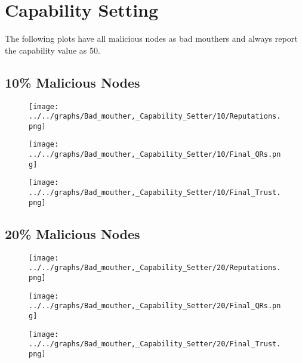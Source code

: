 \section*{Capability Setting}
The following plots have all malicious nodes as bad mouthers and always
report the capability value as 50.
\\
\begin{minipage}[t]{0.49\columnwidth}
\subsection*{10\% Malicious Nodes}
    \begin{figure}[H]
        \centering
        \texttt{[image: ../../graphs/Bad\_mouther,\_Capability\_Setter/10/Reputations.png]}
    \end{figure}
    \begin{figure}[H]
        \centering
        \texttt{[image: ../../graphs/Bad\_mouther,\_Capability\_Setter/10/Final\_QRs.png]}
    \end{figure}
\end{minipage}
\begin{minipage}[t]{0.49\columnwidth}
    \begin{figure}[H]
        \centering
        \texttt{[image: ../../graphs/Bad\_mouther,\_Capability\_Setter/10/Final\_Trust.png]}
    \end{figure}
\end{minipage}

\begin{minipage}[t]{0.49\columnwidth}
\subsection*{20\% Malicious Nodes}
    \begin{figure}[H]
        \centering
        \texttt{[image: ../../graphs/Bad\_mouther,\_Capability\_Setter/20/Reputations.png]}
    \end{figure}
    \begin{figure}[H]
        \centering
        \texttt{[image: ../../graphs/Bad\_mouther,\_Capability\_Setter/20/Final\_QRs.png]}
    \end{figure}
\end{minipage}
\begin{minipage}[t]{0.49\columnwidth}
    \begin{figure}[H]
        \centering
        \texttt{[image: ../../graphs/Bad\_mouther,\_Capability\_Setter/20/Final\_Trust.png]}
    \end{figure}
\end{minipage}

